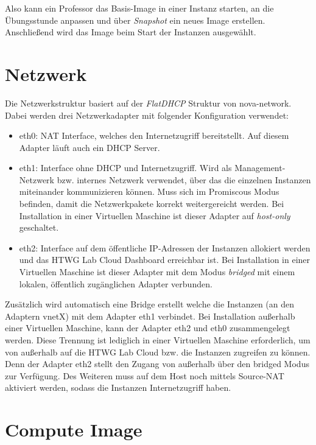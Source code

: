 Also kann ein Professor das Basis-Image in einer Instanz starten, an die Übungsstunde anpassen und über \emph{Snapshot} ein neues Image erstellen.
Anschließend wird das Image beim Start der Instanzen ausgewählt.

\section{Netzwerk}

Die Netzwerkstruktur basiert auf der \emph{FlatDHCP} Struktur von nova-network. 
Dabei werden drei Netzwerkadapter mit folgender Konfiguration verwendet:

\begin{itemize}
\item eth0: NAT Interface, welches den Internetzugriff bereitstellt. Auf diesem Adapter läuft auch ein DHCP Server.
\item eth1: Interface ohne DHCP und Internetzugriff. Wird als Management-Netzwerk bzw. internes Netzwerk verwendet, über das die einzelnen Instanzen miteinander kommunizieren können. Muss sich im Promiscous Modus befinden, damit die Netzwerkpakete korrekt weitergereicht werden. Bei Installation in einer Virtuellen Maschine ist dieser Adapter auf \emph{host-only} geschaltet.
\item eth2: Interface auf dem öffentliche IP-Adressen der Instanzen allokiert werden und das HTWG Lab Cloud Dashboard erreichbar ist. Bei Installation in einer Virtuellen Maschine ist dieser Adapter mit dem Modus \emph{bridged}  mit einem lokalen, öffentlich zugänglichen Adapter verbunden.
\end{itemize}

Zusätzlich wird automatisch eine Bridge erstellt welche die Instanzen (an den Adaptern vnetX) mit dem Adapter eth1 verbindet.
Bei Installation außerhalb einer Virtuellen Maschine, kann der Adapter eth2 und eth0 zusammengelegt werden. 
Diese Trennung ist lediglich in einer Virtuellen Maschine erforderlich, um von außerhalb auf die HTWG Lab Cloud bzw. die Instanzen zugreifen zu können.
Denn der Adapter eth2 stellt den Zugang von außerhalb über den bridged Modus zur Verfügung.
Des Weiteren muss auf dem Host noch mittels  Source-NAT aktiviert werden, sodass die Instanzen Internetzugriff haben.

\section{Compute Image}

